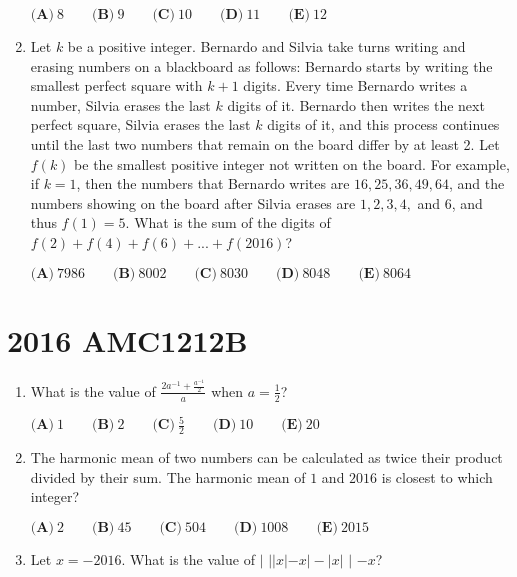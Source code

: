 \documentclass{article}
\begin{document}
\begin{enumerate}[label=\arabic*., itemsep=0.5em]
\(\textbf{(A)}\ 8\qquad\textbf{(B)}\ 9\qquad\textbf{(C)}\ 10\qquad\textbf{(D)}\ 11\qquad\textbf{(E)}\ 12\)\par \vspace{0.5em}\item Let \(k\) be a positive integer. Bernardo and Silvia take turns writing and erasing numbers on a blackboard as follows: Bernardo starts by writing the smallest perfect square with \(k+1\) digits. Every time Bernardo writes a number, Silvia erases the last \(k\) digits of it. Bernardo then writes the next perfect square, Silvia erases the last \(k\) digits of it, and this process continues until the last two numbers that remain on the board differ by at least 2. Let \(f(k)\) be the smallest positive integer not written on the board. For example, if \(k = 1\), then the numbers that Bernardo writes are \(16, 25, 36, 49, 64\), and the numbers showing on the board after Silvia erases are \(1, 2, 3, 4,\) and \(6\), and thus \(f(1) = 5\). What is the sum of the digits of \(f(2) + f(4)+ f(6) + ... + f(2016)\)?

\(\textbf{(A)}\ 7986\qquad\textbf{(B)}\ 8002\qquad\textbf{(C)}\ 8030\qquad\textbf{(D)}\ 8048\qquad\textbf{(E)}\ 8064\)\par \vspace{0.5em}\end{enumerate}\newpage\section*{2016 AMC1212B}\begin{enumerate}[label=\arabic*., itemsep=0.5em]\item What is the value of \(\frac{2a^{-1}+\frac{a^{-1}}{2}}{a}\) when \(a= \frac{1}{2}\)?

\(\textbf{(A)}\ 1\qquad\textbf{(B)}\ 2\qquad\textbf{(C)}\ \frac{5}{2}\qquad\textbf{(D)}\ 10\qquad\textbf{(E)}\ 20\)\par \vspace{0.5em}\item The harmonic mean of two numbers can be calculated as twice their product divided by their sum. The harmonic mean of \(1\) and \(2016\) is closest to which integer?

\(\textbf{(A)}\ 2 \qquad
\textbf{(B)}\ 45 \qquad
\textbf{(C)}\ 504 \qquad
\textbf{(D)}\ 1008 \qquad
\textbf{(E)}\ 2015 \)\par \vspace{0.5em}\item Let \(x=-2016\). What is the value of \(\bigg|\) \(||x|-x|-|x|\) \(\bigg|\) \(-x\)?


\end{enumerate}
\end{document}
